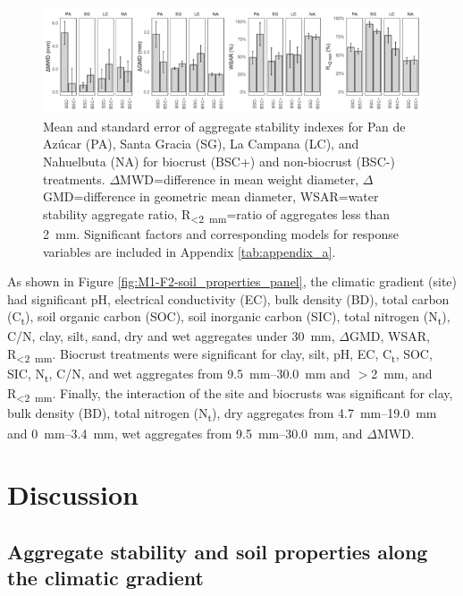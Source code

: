 \begin{figure}[H]
	\centering
	\includegraphics[width=1\textwidth]{img/M1-Figure_5.png}
	\caption{Mean and standard error of aggregate stability indexes for Pan de Azúcar (PA), Santa Gracia (SG), La Campana (LC),
    and Nahuelbuta (NA) for biocrust (BSC+) and non-biocrust (BSC-) treatments. $\Delta$MWD=difference in mean weight diameter,
    $\Delta$GMD=difference in geometric mean diameter, WSAR=water stability aggregate ratio, R\textsubscript{<\SI{2}{\milli\meter}}=ratio of aggregates less than \SI{2}{\milli\meter}. Significant factors and corresponding models for response variables are included in Appendix \ref{tab:appendix_a}.}
	\label{fig:M1-F5}
\end{figure}

\FloatBarrier

As shown in Figure \ref{fig:M1-F2-soil_properties_panel}, the climatic gradient (site) had significant pH, electrical conductivity (EC), bulk density (BD), total carbon (C\textsubscript{t}), soil organic carbon (SOC), soil inorganic carbon (SIC), total nitrogen (N\textsubscript{t}), C/N, clay, silt, sand, dry and wet aggregates under \SI{30}{\milli\meter}, $\Delta$GMD, WSAR, R\textsubscript{<\SI{2}{\milli\meter}}. Biocrust treatments were significant for clay, silt, pH, EC, C\textsubscript{t}, SOC, SIC, N\textsubscript{t}, C/N, and wet aggregates from \SIrange{9.5}{30.0}{\milli\meter} and $>$\SI{2}{\milli\meter}, and R\textsubscript{<\SI{2}{\milli\meter}}. Finally, the interaction of the site and biocrusts was significant for clay, bulk density (BD), total nitrogen (N\textsubscript{t}), dry aggregates from \SIrange{4.7}{19.0}{\milli\meter} and \SIrange{0}{3.4}{\milli\meter}, wet aggregates from \SIrange{9.5}{30.0}{\milli\meter}, and $\Delta$MWD.

\section{Discussion}

\subsection{Aggregate stability and soil properties along the climatic gradient}

